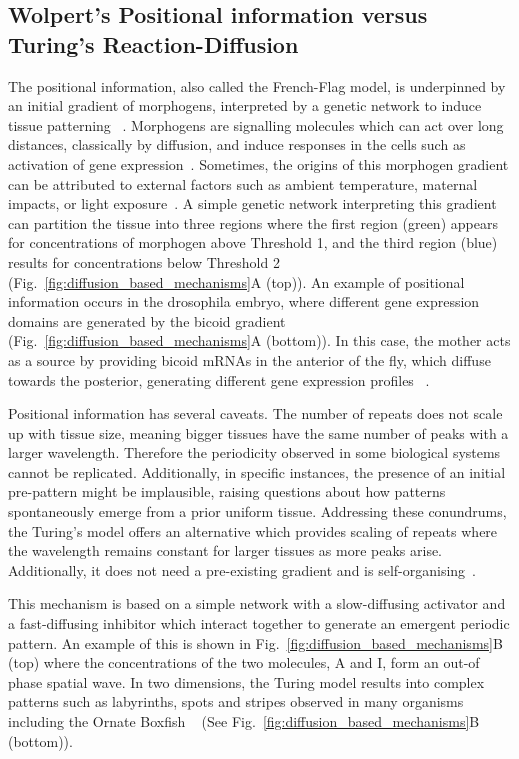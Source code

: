 \subsection{Wolpert's Positional information versus Turing's Reaction-Diffusion}
The positional information, also called the French-Flag model, is underpinned by an initial gradient of morphogens, interpreted by a genetic network to induce tissue patterning ~\parencite{Wolpert1969}.
Morphogens are signalling molecules which can act over long distances, classically by diffusion, and induce responses in the cells such as activation of gene expression~\parencite{rogers2011morphogen}.
Sometimes, the origins of this morphogen gradient can be attributed to external factors such as ambient temperature, maternal impacts, or light exposure~\parencite{Schier2009}.
A simple genetic network interpreting this gradient can partition the tissue into three regions where the first region (green) appears for concentrations of morphogen above Threshold 1, and the third region (blue) results for concentrations below Threshold 2 (Fig.~\ref{fig:diffusion_based_mechanisms}A (top)).
An example of positional information occurs in the drosophila embryo, where different gene expression domains are generated by the bicoid gradient (Fig.~\ref{fig:diffusion_based_mechanisms}A (bottom)).
In this case, the mother acts as a source by providing bicoid mRNAs in the anterior of the fly, which diffuse towards the posterior, generating different gene expression profiles ~\parencite{grimm2010modelling}.

Positional information has several caveats.
The number of repeats does not scale up with tissue size, meaning bigger tissues have the same number of peaks with a larger wavelength.
Therefore the periodicity observed in some biological systems cannot be replicated.
Additionally, in specific instances, the presence of an initial pre-pattern might be implausible, raising questions about how patterns spontaneously emerge from a prior uniform tissue.
Addressing these conundrums, the Turing's model offers an alternative which provides scaling of repeats where the wavelength remains constant for larger tissues as more peaks arise.
Additionally, it does not need a pre-existing gradient and is self-organising~\parencite{Turing1952, Kondo2010a}.

This mechanism is based on a simple network with a slow-diffusing activator and a fast-diffusing inhibitor which interact together to generate an emergent periodic pattern.
An example of this is shown in Fig.~\ref{fig:diffusion_based_mechanisms}B (top) where the concentrations of the two molecules, A and I, form an out-of phase spatial wave.
In two dimensions, the Turing model results into complex patterns such as labyrinths, spots and stripes observed in many organisms including the Ornate Boxfish ~\parencite{Alessio2023} (See Fig.~\ref{fig:diffusion_based_mechanisms}B (bottom)).

